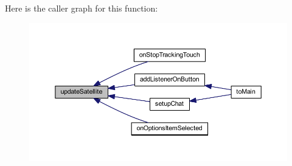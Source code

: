 Here is the caller graph for this function\-:\nopagebreak
\begin{figure}[H]
\begin{center}
\leavevmode
\includegraphics[width=350pt]{classcom_1_1example_1_1android_1_1_bluetooth_chat_1_1_l_a_s_a_r_control_ab084bbab05e4d41e495608164e6bd56c_icgraph}
\end{center}
\end{figure}




